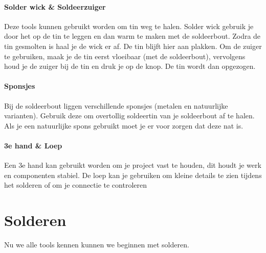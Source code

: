 \documentclass{guide}
\begin{document}
\paragraph{Solder wick \& Soldeerzuiger}
Deze tools kunnen gebruikt worden om tin weg te halen. Solder wick gebruik je door het op de tin te leggen en dan warm te maken met de soldeerbout. Zodra de tin gesmolten is haal je de wick er af. De tin blijft hier aan plakken. Om de zuiger te gebruiken, maak je de tin eerst vloeibaar (met de soldeerbout), vervolgens houd je de zuiger bij de tin en druk je op de knop. De tin wordt dan opgezogen.

\paragraph{Sponsjes}
Bij de soldeerbout liggen verschillende sponsjes (metalen en natuurlijke varianten). Gebruik deze om overtollig soldeertin van je soldeerbout af te halen. Als je een natuurlijke spons gebruikt moet je er voor zorgen dat deze nat is.

\paragraph{3e hand \& Loep}
Een 3e hand kan gebruikt worden om je project vast te houden, dit houdt je werk en componenten stabiel. De loep kan je gebruiken om kleine details te zien tijdens het solderen of om je connectie te controleren

\newpage
\section{Solderen}
Nu we alle tools kennen kunnen we beginnen met solderen.\\
\end{document}
